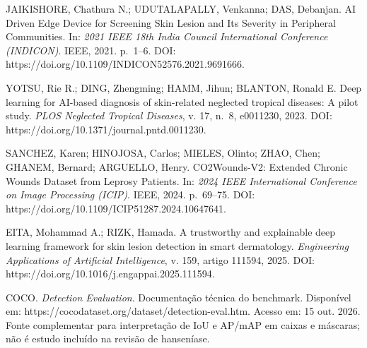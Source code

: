\documentclass[
]{article}
\begin{document}
JAIKISHORE, Chathura N.; UDUTALAPALLY, Venkanna; DAS, Debanjan. AI
Driven Edge Device for Screening Skin Lesion and Its Severity in
Peripheral Communities. In: \emph{2021 IEEE 18th India Council
International Conference (INDICON)}. IEEE, 2021. p.~1--6. DOI:
https://doi.org/10.1109/INDICON52576.2021.9691666.

YOTSU, Rie R.; DING, Zhengming; HAMM, Jihun; BLANTON, Ronald E. Deep
learning for AI-based diagnosis of skin-related neglected tropical
diseases: A pilot study. \emph{PLOS Neglected Tropical Diseases}, v. 17,
n.~8, e0011230, 2023. DOI: https://doi.org/10.1371/journal.pntd.0011230.

SANCHEZ, Karen; HINOJOSA, Carlos; MIELES, Olinto; ZHAO, Chen; GHANEM,
Bernard; ARGUELLO, Henry. CO2Wounds-V2: Extended Chronic Wounds Dataset
from Leprosy Patients. In: \emph{2024 IEEE International Conference on
Image Processing (ICIP)}. IEEE, 2024. p.~69--75. DOI:
https://doi.org/10.1109/ICIP51287.2024.10647641.

EITA, Mohammad A.; RIZK, Hamada. A trustworthy and explainable deep
learning framework for skin lesion detection in smart dermatology.
\emph{Engineering Applications of Artificial Intelligence}, v. 159,
artigo 111594, 2025. DOI:
https://doi.org/10.1016/j.engappai.2025.111594.

COCO. \emph{Detection Evaluation}. Documentação técnica do benchmark.
Disponível em: https://cocodataset.org/dataset/detection-eval.htm.
Acesso em: 15 out. 2026. Fonte complementar para interpretação de IoU e
AP/mAP em caixas e máscaras; não é estudo incluído na revisão de
hanseníase.
\end{document}
